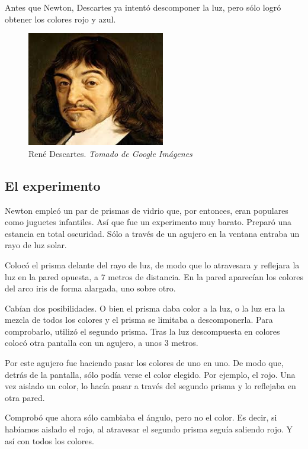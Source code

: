 \documentclass[journal]{IEEEtran}
\begin{document}
Antes que Newton, Descartes ya intentó descomponer la luz, pero sólo logró obtener los colores rojo y azul.

\begin{center}
  \begin{figure}[h!]
  \includegraphics[width=60mm]{descartes.jpg}
  \caption{René Descartes. \emph{Tomado de Google Imágenes}}
  \end{figure}
\end{center}

\subsection{El experimento}

Newton empleó un par de prismas de vidrio que, por entonces, eran populares como juguetes infantiles. Así que fue un experimento muy barato. Preparó una estancia en total oscuridad. Sólo a través de un agujero en la ventana entraba un rayo de luz solar. 

Colocó el prisma delante del rayo de luz, de modo que lo atravesara y reflejara la luz en la pared opuesta, a 7 metros de distancia. En la pared aparecían los colores del arco iris de forma alargada, uno sobre otro.

Cabían dos posibilidades. O bien el prisma daba color a la luz, o la luz era la mezcla de todos los colores y el prisma se limitaba a descomponerla. Para comprobarlo, utilizó el segundo prisma. Tras la luz descompuesta en colores colocó otra pantalla con un agujero, a unos 3 metros. 

Por este agujero fue haciendo pasar los colores de uno en uno. De modo que, detrás de la pantalla, sólo podía verse el color elegido. Por ejemplo, el rojo. Una vez aislado un color, lo hacía pasar a través del segundo prisma y lo reflejaba en otra pared.

Comprobó que ahora sólo cambiaba el ángulo, pero no el color. Es decir, si habíamos aislado el rojo, al atravesar el segundo prisma seguía saliendo rojo. Y así con todos los colores. 
\end{document}
